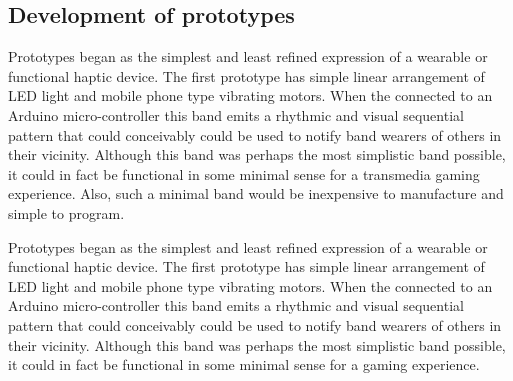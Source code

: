 \documentclass{chi-ext}
\begin{document}
\subsection{Development of prototypes}
Prototypes began as the simplest and least refined expression of a wearable or functional haptic device. The first prototype has simple linear arrangement of LED light and mobile phone type vibrating motors. When the connected to an Arduino micro-controller this band emits a rhythmic and visual sequential pattern that could conceivably could be used to notify band wearers of others in their vicinity. Although this band was perhaps the most simplistic band possible, it could in fact be functional in some minimal sense for a transmedia gaming experience. Also, such a minimal band would be inexpensive to manufacture and simple to program. 

Prototypes began as the simplest and least refined expression of a wearable or functional haptic device. The first prototype has simple linear arrangement of LED light and mobile phone type vibrating motors. When the connected to an Arduino micro-controller this band emits a rhythmic and visual sequential pattern that could conceivably could be used to notify band wearers of others in their vicinity. Although this band was perhaps the most simplistic band possible, it could in fact be functional in some minimal sense for a gaming experience. 

\end{document}
